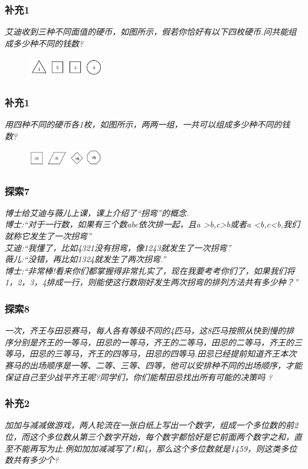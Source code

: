 \begin{frame}
    \frametitle{补充1}
    \textit{艾迪收到三种不同面值的硬币，如图所示，假若你恰好有以下四枚硬币.问共能组成多少种不同的钱数?}
    \begin{figure}[H] 
        \centering
        \includegraphics[width=0.3\textwidth]{./pics/Chapter_2/buchong1_2.png}
    \end{figure}
\end{frame}


\begin{frame}
    \frametitle{补充1}
    \textit{用四种不同的硬币各1枚，如图所示，两两一组，一共可以组成多少种不同的钱数?}
    \begin{figure}[H] 
        \centering
        \includegraphics[width=0.3\textwidth]{./pics/Chapter_2/buchong1_3.png}
    \end{figure}
\end{frame}

\begin{frame}
    \frametitle{探索7}
    \textit{博士给艾迪与薇儿上课，课上介绍了``拐弯''的概念.\\
    博士:``对于一行数，如果有三个数abc依次排一起，且a >b,c>b或者a <b,c<b,我们就称它发生了一次拐弯''\\
    艾迪:``我懂了，比如4321没有拐弯，像1243就发生了一次拐弯''\\
    薇儿:``没错，再比如1324就发生了两次拐弯.''\\
    博士:``非常棒!看来你们都掌握得非常扎实了，现在我要考考你们了，如果我们将1，2，3，4排成一行，则能使这行数刚好发生两次拐弯的排列方法共有多少种？''}
\end{frame}

\begin{frame}
    \frametitle{探索8}
    \textit{一次，齐王与田忌赛马，每人各有等级不同的4匹马，这8匹马按照从快到慢的排序分别是齐王的一等马，田忌的一等马，齐王的二等马，田忌的二等马，齐王的三等马，田忌的三等马，齐王的四等马，田忌的四等马.田忌已经提前知道齐王本次赛马的出场顺序是一等、二等、三等、四等，他可以安排种不同的出场顺序，才能保证自己至少战平齐王呢?同学们，你们能帮田忌找出所有可能的决策吗 ?}
\end{frame}

\begin{frame}
    \frametitle{补充2}
    \textit{加加与减减做游戏，两人轮流在一张白纸上写出一个数字，组成一个多位数的前2位，而这个多位数从第三个数字开始，每个数字都恰好是它前面两个数字之和，直至不能再写为止.例如加加减减写了1和4，那么这个多位数就是1459，则这类多位数共有多少个?}
\end{frame}

